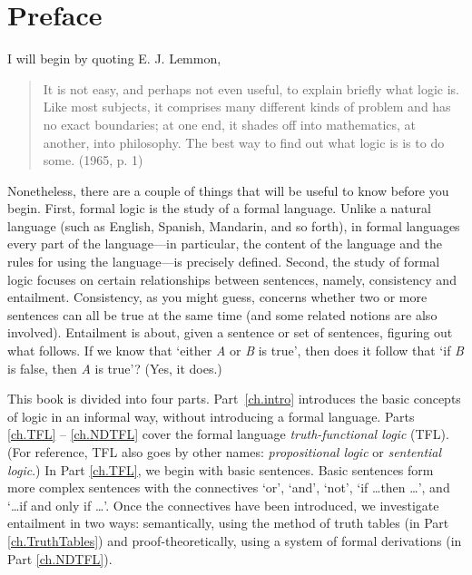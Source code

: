 \chapter{Preface}

I will begin by quoting E. J. Lemmon,
\begin{quote}
It is not easy, and perhaps not even useful, to explain briefly what logic is. Like most subjects, it comprises many different kinds of problem and has no exact boundaries; at one end, it shades off into mathematics, at another, into philosophy. The best way to find out what logic is is to do some. (1965, p. 1)
\end{quote}
Nonetheless, there are a couple of things that will be useful to know before you begin. First, formal logic is the study of a formal language. Unlike a natural language (such as English, Spanish, Mandarin, and so forth), in formal languages every part of the language—in particular, the content of the language and the rules for using the language—is precisely defined. Second, the study of formal logic focuses on certain relationships between sentences, namely, consistency and entailment. Consistency, as you might guess, concerns whether two or more sentences can all be  true at the same time (and some related notions  are also involved). Entailment is  about, given a sentence or set of sentences, figuring out what follows. If we know that `either \textit{A} or \textit{B} is true', then does it follow that `if \textit{B} is false, then \textit{A} is true'? (Yes, it  does.)  

This book is divided into four parts. Part~\ref{ch.intro} introduces the basic concepts of logic in an informal way, without introducing a formal language. Parts \ref{ch.TFL} -- \ref{ch.NDTFL} cover the formal language \textit{truth-functional logic} (TFL). (For reference, TFL also goes by other names: \textit{propositional logic} or \textit{sentential logic}.) In Part \ref{ch.TFL}, we begin with basic sentences. Basic sentences form more complex sentences with the connectives ‘or’, ‘and’, ‘not’, ‘if \ldots then \ldots’, and `\ldots if and only if \ldots'. Once the connectives have been introduced, we investigate entailment in two ways: semantically, using the method of truth tables (in Part \ref{ch.TruthTables}) and proof-theoretically, using a system of formal derivations (in Part \ref{ch.NDTFL}). 


